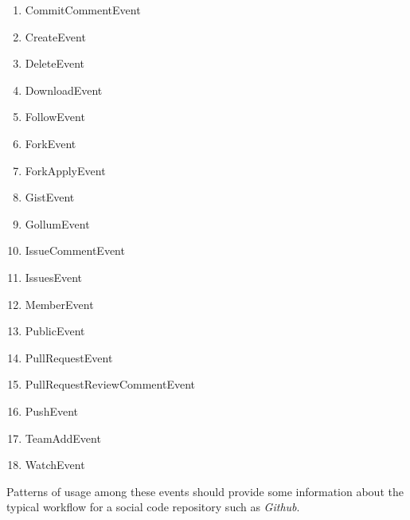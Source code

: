\documentclass[11pt]{article}
\theoremstyle{definition}
\begin{document}
\begin{multicols}{2}
\begin{enumerate}
\item CommitCommentEvent
\item CreateEvent
\item DeleteEvent
\item DownloadEvent
\item FollowEvent
\item ForkEvent
\item ForkApplyEvent
\item GistEvent
\item GollumEvent
\item IssueCommentEvent
\item IssuesEvent
\item MemberEvent
\item PublicEvent
\item PullRequestEvent
\item PullRequestReviewCommentEvent
\item PushEvent
\item TeamAddEvent
\item WatchEvent
\end{enumerate}

Patterns of usage among these events should provide some information
about the typical workflow for a social code repository such as
\emph{Github}.




\end{multicols}
\end{document}
